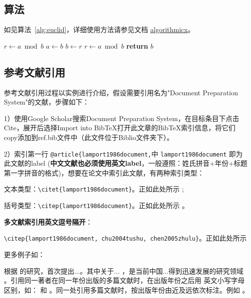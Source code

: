 \subsection{算法}

如见算法~\ref{alg:euclid}，详细使用方法请参见文档 \href{https://ctan.org/pkg/algorithmicx?lang=en}{algorithmicx}。

\begin{algorithm}[!htbp]
    \small
    \caption{Euclid's algorithm}\label{alg:euclid}
    \begin{algorithmic}[1]
            \State $r\gets a\bmod b$
                \State $a\gets b$
                \State $b\gets r$
                \State $r\gets a\bmod b$
            \EndWhile\label{euclidendwhile}
            \State \textbf{return} $b$
        \EndProcedure
    \end{algorithmic}
\end{algorithm}

\subsection{参考文献引用}

参考文献引用过程以实例进行介绍，假设需要引用名为"Document Preparation System"的文献，步骤如下：

1）使用Google Scholar搜索Document Preparation System，在目标条目下点击Cite，展开后选择Import into BibTeX打开此文章的BibTeX索引信息，将它们copy添加到ref.bib文件中（此文件位于Biblio文件夹下）。

2）索引第一行 \verb|@article{lamport1986document,|中 \verb|lamport1986document| 即为此文献的label (\textbf{中文文献也必须使用英文label}，一般遵照：姓氏拼音+年份+标题第一字拼音的格式)，想要在论文中索引此文献，有两种索引类型：

文本类型：\verb|\citet{lamport1986document}|。正如此处所示 \citet{lamport1986document};

括号类型：\verb|\citep{lamport1986document}|。正如此处所示 \citep{lamport1986document}。

\textbf{多文献索引用英文逗号隔开}：

\verb|\citep{lamport1986document, chu2004tushu, chen2005zhulu}|。正如此处所示 \citep{lamport1986document, chu2004tushu, chen2005zhulu}

更多例子如：

\citet{walls2013drought} 根据 \citet{betts2005aging} 的研究，首次提出...。其中关于... \citep{walls2013drought, betts2005aging}，是当前中国...得到迅速发展的研究领域 \citep{chen1980zhongguo, bravo1990comparative}。引用同一著者在同一年份出版的多篇文献时，在出版年份之后用
英文小写字母区别，如：\citep{yuan2012lana, yuan2012lanb, yuan2012lanc} 和 \citet{yuan2012lana, yuan2012lanb, yuan2012lanc}。同一处引用多篇文献时，按出版年份由近及远依次标注。例如 \citep{chen1980zhongguo, stamerjohanns2009mathml, hls2012jinji, niu2013zonghe}。

